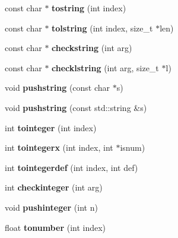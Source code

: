 \begin{DoxyCompactItemize}
const char $\ast$ {\bfseries tostring} (int index)
\item 
\mbox{\label{classlua_1_1State_aa55cd3180350a020941b4ba4108d2057}} 
const char $\ast$ {\bfseries tolstring} (int index, size\+\_\+t $\ast$len)
\item 
\mbox{\label{classlua_1_1State_aaf94e52cbf1b849943cc1ddcb4bbd640}} 
const char $\ast$ {\bfseries checkstring} (int arg)
\item 
\mbox{\label{classlua_1_1State_a2eb2a0ef66a612ac8569eae56f932202}} 
const char $\ast$ {\bfseries checklstring} (int arg, size\+\_\+t $\ast$l)
\item 
\mbox{\label{classlua_1_1State_a6cfe41f8b84496836d273447a2be8244}} 
void {\bfseries pushstring} (const char $\ast$s)
\item 
\mbox{\label{classlua_1_1State_a772e65ddd5b6a8c7396dcbd6ab2810a6}} 
void {\bfseries pushstring} (const std\+::string \&s)
\item 
\mbox{\label{classlua_1_1State_a00313b3fa899a49316c827c15b408a3d}} 
int {\bfseries tointeger} (int index)
\item 
\mbox{\label{classlua_1_1State_a205ca78d9061fabce463a3fcc3772995}} 
int {\bfseries tointegerx} (int index, int $\ast$isnum)
\item 
\mbox{\label{classlua_1_1State_a1856631b3efb23d96ae6ec8f9704f7c9}} 
int {\bfseries tointegerdef} (int index, int def)
\item 
\mbox{\label{classlua_1_1State_a60a2c3a082988f8a92809f86afa0e746}} 
int {\bfseries checkinteger} (int arg)
\item 
\mbox{\label{classlua_1_1State_a6646a8ceec719037fa8a15a95b11c91b}} 
void {\bfseries pushinteger} (int n)
\item 
\mbox{\label{classlua_1_1State_aebf7c9578653ee1c2b6af88d70dab863}} 
float {\bfseries tonumber} (int index)
\item 

\end{DoxyCompactItemize}

